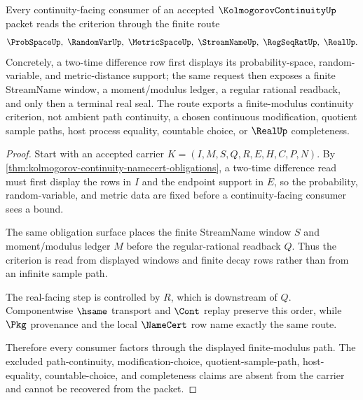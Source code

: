 \begin{theorem}
\label{thm:kolmogorov-continuity-finite-modulus-route}
Every continuity-facing consumer of an accepted $\KolmogorovContinuityUp$ packet reads the criterion through the finite route
$$
\ProbSpaceUp,\ \RandomVarUp,\ \MetricSpaceUp,\ \StreamNameUp,\ \RegSeqRatUp,\ \RealUp .
$$
Concretely, a two-time difference row first displays its probability-space, random-variable, and metric-distance support; the same request then exposes a finite StreamName window, a moment/modulus ledger, a regular rational readback, and only then a terminal real seal. The route exports a finite-modulus continuity criterion, not ambient path continuity, a chosen continuous modification, quotient sample paths, host process equality, countable choice, or $\RealUp$ completeness.
\end{theorem}
\begin{proof}
Start with an accepted carrier $K=(I,M,S,Q,R,E,H,C,P,N)$. By \autoref{thm:kolmogorov-continuity-namecert-obligations}, a two-time difference read must first display the rows in $I$ and the endpoint support in $E$, so the probability, random-variable, and metric data are fixed before a continuity-facing consumer sees a bound.

The same obligation surface places the finite StreamName window $S$ and moment/modulus ledger $M$ before the regular-rational readback $Q$. Thus the criterion is read from displayed windows and finite decay rows rather than from an infinite sample path.

The real-facing step is controlled by $R$, which is downstream of $Q$. Componentwise $\hsame$ transport and $\Cont$ replay preserve this order, while $\Pkg$ provenance and the local $\NameCert$ row name exactly the same route.

Therefore every consumer factors through the displayed finite-modulus path. The excluded path-continuity, modification-choice, quotient-sample-path, host-equality, countable-choice, and completeness claims are absent from the carrier and cannot be recovered from the packet.
\end{proof}


